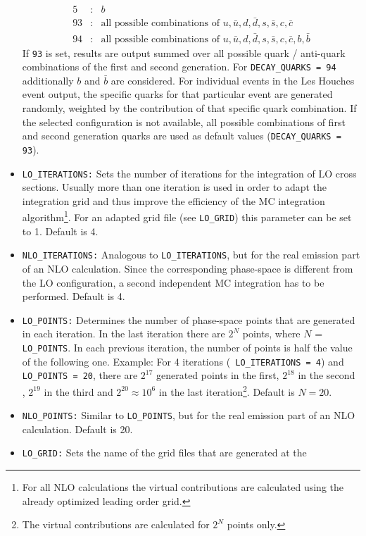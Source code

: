 \documentclass[english,12pt]{article}
\begin{document}
\begin{itemize}
\begin{eqnarray}
5 &:& b \nonumber \\
93 &:& \mbox{all possible combinations of $u, \bar{u}, d, \bar{d}, s, \bar{s}, c, \bar{c}$} \nonumber \\
94 &:& \mbox{all possible combinations of $u, \bar{u}, d, \bar{d}, s, \bar{s}, c, \bar{c}, b, \bar{b}$} \nonumber
\end{eqnarray}
If {\tt 93} is set, results are output summed over all possible quark / anti-quark 
combinations of the first and second generation.
For {\tt DECAY\_QUARKS = 94} additionally $b$ and $\bar{b}$ are considered.
For individual events in the Les Houches event output, the specific quarks for
that particular event are generated randomly, weighted by the contribution
of that specific quark combination.
If the selected configuration is not available, all possible combinations
of first and second generation quarks are used as default values
({\tt DECAY\_QUARKS = 93}).
\item {\tt LO\_ITERATIONS:} Sets the number of iterations for the integration
of LO cross sections. Usually more than one iteration is used in
order to adapt the integration grid and thus improve the efficiency of the
MC integration algorithm\footnote{For all NLO calculations the virtual
  contributions are calculated using the already optimized leading order grid.}. 
For an adapted grid file (see {\tt LO\_GRID})
this parameter can be set to 1. Default is 4.
\item {\tt NLO\_ITERATIONS:} Analogous to  {\tt LO\_ITERATIONS}, but for the real
emission part of an NLO calculation. Since the corresponding phase-space 
is different from the LO configuration, a second independent
MC integration has to be performed. Default is 4.
\item {\tt LO\_POINTS:} Determines the number of phase-space points that are
generated in each iteration. In the last iteration there are $2^N$ points,
where $N$ = {\tt LO\_POINTS}. In each previous iteration, the number of points
is half the value of the following one. Example: For 4 iterations ({\tt
LO\_ITERATIONS = 4}) and {\tt LO\_POINTS = 20}, there are $2^{17}$ generated
points in the first, $2^{18}$ in the second , $2^{19}$ in the third and
$2^{20}\approx 10^6$ in the last iteration\footnote{The virtual contributions
  are calculated for $2^{N}$ points only.}. 
Default is $N={20}$.
\item {\tt NLO\_POINTS:} Similar to {\tt LO\_POINTS}, but for the real emission
part of an NLO calculation.  Default is 20.
\item {\tt LO\_GRID:} Sets the name of the grid files that are generated at the

\end{itemize}
\end{document}
